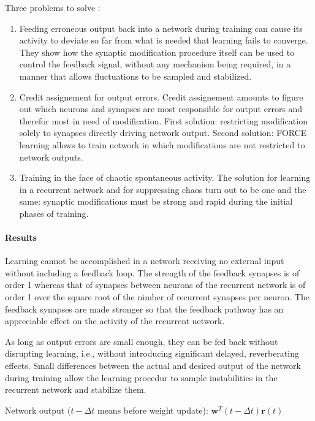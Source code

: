 \documentclass[12pt]{article}
\begin{document}
Three problems to solve : \begin{enumerate}
\item Feeding erroneous output back into a network during training can cause its activity to deviate so far from what is needed that learning fails to converge. They show how the synaptic modification procedure itself can be used to control the feedback signal, without any mechanism being required, in a manner that allows fluctuations to be sampled and stabilized.

\item Credit assignement for output errors. Credit assignement amounts to figure out which neurons and synapses are most responsible for output errors and therefor most in need of modification. First solution: restricting modification solely to synapses directly driving network output. Second solution: FORCE learning allows to train network in which modifications are not restricted to network outputs.

\item Training in the face of chaotic spontaneous activity. The solution for learning in a recurrent network and for suppressing chaos turn out to be one and the same: synaptic modifications must be strong and rapid during the initial phases of training.
\end{enumerate}

\paragraph{Results} Learning cannot be accomplished in a network receiving no external input without including a feedback loop. The strength of the feedback synapses is of order 1 whereas that of synapses between neurons of the recurrent network is of order 1 over the square root of the nimber of recurrent synapses per neuron. The feedback synapses are made stronger so that the feedback pathway has an appreciable effect on the activity of the recurrent network.

As long as output errors are small enough, they can be fed back without disrupting learning, i.e., without introducing significant delayed, reverberating effects. Small differences between the actual and desired output of the network during training allow the learning procedur to sample instabilities in the recurrent network and stabilize them.

Network output ($t - \Delta t$ means before weight update): $\mathbf{w}^T(t - \Delta t) \mathbf{r}(t)$
\end{document}
